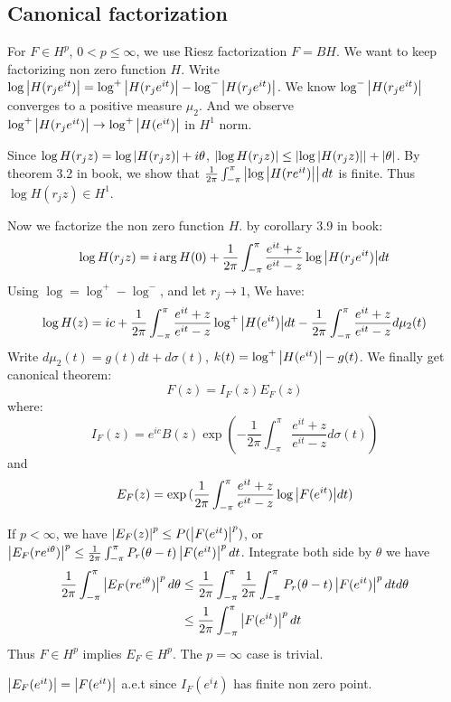 \subsection{Canonical factorization}
For $F\in H^p$, $0<p\leq\infty$, we use Riesz factorization $F=BH$. We want to keep factorizing non zero function $H$. Write $\log{\left\lvert H(r_je^{it})\right\rvert}=\log^+{\left\lvert H(r_je^{it})\right\rvert}-\log^-{\left\lvert H(r_je^{it})\right\rvert}$. We know $\log^-{\left\lvert H(r_je^{it})\right\rvert}$ converges to a positive measure $\mu_2$. And we observe $\log^+{\left\lvert H(r_je^{it})\right\rvert}\to \log^+{\left\lvert H(e^{it})\right\rvert}$ in $H^1$ norm. \par
Since $\log{H(r_jz)}=\log{\left\lvert H(r_jz)\right\rvert}+i\theta$,
$\left\lvert\log{H(r_jz)}\right\rvert\leq \left\lvert\log{\left\lvert H(r_jz)\right\rvert}\right\rvert+\left\lvert\theta\right\rvert$. By theorem 3.2 in book, we show that $\frac{1}{2\pi}\int_{-\pi}^{\pi}{\left\lvert\log{\left\lvert H(re^{it})\right\rvert}\right\rvert d t}$ is
finite. Thus $\log{H(r_jz)}\in H^1$.\par
Now we factorize the non zero function $H$. by corollary 3.9 in book:
\begin{equation*}
    \log{H(r_jz)}=i\arg{H(0)}+\frac{1}{2\pi}\int_{-\pi}^{\pi}{\frac{e^{it}+z}{e^{it}-z}\log{\left\lvert H(r_je^{it})\right\rvert}d t}
\end{equation*}
Using $\log=\log^+-\log^-$, and let $r_j\to 1$, We have:
\begin{equation*}
    \log{H(z)}=i c+\frac{1}{2\pi}\int_{-\pi}^{\pi}{\frac{e^{it}+z}{e^{it}-z}\log^+{\left\lvert H(e^{it})\right\rvert}d t}-\frac{1}{2\pi}\int_{-\pi}^{\pi}{\frac{e^{it}+z}{e^{it}-z}d\mu_2(t)}
\end{equation*}
Write $d\mu_2(t)=g(t)d t+d\sigma(t)$, $k(t)=\log^+{\left\lvert H(e^{it})\right\rvert}-g(t)$. We finally get canonical theorem:
\begin{equation*}
    F(z)=I_F(z)E_F(z)
\end{equation*}
where:
\begin{equation*}
    I_F(z)=e^{i c}B(z)\exp{(-\frac{1}{2\pi}\int_{-\pi}^{\pi}{\frac{e^{it}+z}{e^{it}-z}d\sigma(t)})}
\end{equation*}
and
\begin{equation*}
    E_F(z)=\exp{(\frac{1}{2\pi}\int_{-\pi}^{\pi}{\frac{e^{it}+z}{e^{it}-z}\log{\left\lvert F(e^{it})\right\rvert}d t})}
\end{equation*}
\begin{remark}\label{rmk: property of factorization}
    If $p<\infty$, we have $\left\lvert E_F(z)\right\rvert^p\leq P(\left\lvert F(e^{it})\right\rvert^p)$, or $\left\lvert E_F(re^{i\theta})\right\rvert^p\leq \frac{1}{2\pi}\int_{-\pi}^{\pi}P_r(\theta-t)\left\lvert F(e^{it})\right\rvert^p dt$.
    Integrate both side by $\theta$ we have
    \begin{align*}
        \frac{1}{2\pi}\int_{-\pi}^{\pi}\left\lvert E_F(re^{i\theta})\right\rvert^p d\theta & \leq \frac{1}{2\pi}\int_{-\pi}^{\pi}\frac{1}{2\pi}\int_{-\pi}^{\pi}P_r(\theta-t)\left\lvert F(e^{it})\right\rvert^p d t d\theta \\
                                                                         & \leq\frac{1}{2\pi}\int_{-\pi}^{\pi}\left\lvert F(e^{it})\right\rvert^p d t
    \end{align*}
    Thus $F\in H^p$ implies $E_F\in H^p$. The $p=\infty$ case is trivial. \par
    $\left\lvert E_F(e^{it})\right\rvert=\left\lvert F(e^{it})\right\rvert$ a.e.t since $I_F(e^it)$ has finite non zero point.
\end{remark}
